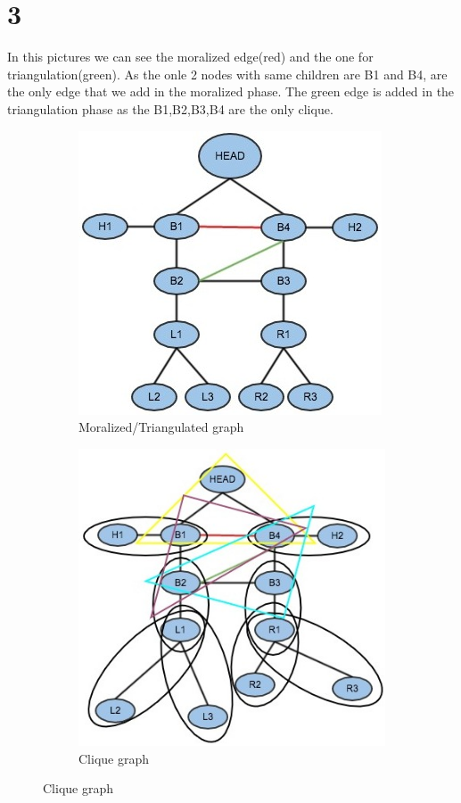 \section*{3}
In this pictures we can see the moralized edge(red) and the one for
triangulation(green). As the onle 2 nodes with same children are B1 and 
B4, are the only edge that we add in the moralized phase. The green edge
is added in the triangulation phase as the B1,B2,B3,B4 are the only clique.
\begin{figure}[ht]
  \begin{subfigure}[b]{0.5\linewidth}
    \centering
    \includegraphics[width=0.75\linewidth]{figures/ml5.jpg}
    \caption{Moralized/Triangulated graph}
    \vspace{4ex}
  \end{subfigure}%
  \begin{subfigure}[b]{0.5\linewidth}
    \centering
    \includegraphics[width=0.75\linewidth]{figures/ml5triang.jpg}
    \caption{Clique graph}
    \vspace{4ex}
  \end{subfigure}
\end{figure}
